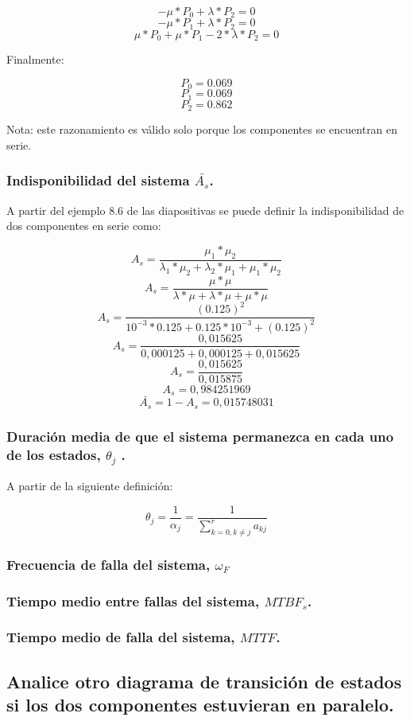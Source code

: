 \documentclass[
    11pt,
    spanish,
    a4paper
]{article}
\begin{document}
$$ -\mu * P_0 + \lambda * P_2 = 0 $$
$$ -\mu * P_1 + \lambda * P_2 = 0 $$
$$  \mu * P_0 + \mu * P_1   - 2 * \lambda * P_2 = 0 $$

Finalmente:

$$ P_0 = 0.069 $$
$$ P_1 = 0.069 $$
$$ P_2 = 0.862 $$

Nota: este razonamiento es válido solo porque los componentes se encuentran en serie.

\subsubsection{Indisponibilidad del sistema $ \bar{A_s} $.}

A partir del ejemplo 8.6 de las diapositivas se puede definir la indisponibilidad de dos componentes en serie como:


$$ A_s = \frac{\mu_1*\mu_2}{\lambda_1*\mu_2+\lambda_2*\mu_1+\mu_1*\mu_2}$$
$$ A_s = \frac{\mu *\mu}{\lambda*\mu+\lambda*\mu+\mu*\mu}$$
$$ A_s = \frac{(0.125)^2}{10^{-3} * 0.125 +0.125 * 10^{-3}+(0.125)^2}$$
$$ A_s = \frac{0,015625}{0,000125+0,000125+0,015625}$$
$$ A_s = \frac{0,015625}{0,015875}$$
$$ A_s = 0,984251969$$
$$ \bar{A_s} = 1 - A_s = 0,015748031 $$


\subsubsection{Duración media de que el sistema permanezca en cada uno de los estados, $ \theta_j $ .}

A partir de la siguiente definición:

$$ \theta_j = \frac{1}{\alpha_j} = \frac{1}{\sum_{k=0, k \neq j}^{r} a_{kj}} $$

\subsubsection{Frecuencia de falla del sistema, $ \omega_F $}
\subsubsection{Tiempo medio entre fallas del sistema, $ MTBF_s $.}
\subsubsection{Tiempo medio de falla del sistema, $ MTTF $.}


\subsection{Analice otro diagrama de transición de estados si los dos componentes estuvieran en paralelo.}
\end{document}
